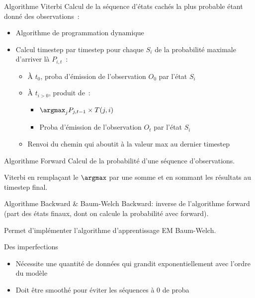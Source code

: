 \begin{frame}{Algorithme Viterbi}
  Calcul de la séquence d'états cachés la plus probable étant donné des observations~:
  \begin{itemize}[<+->]
  \item Algorithme de programmation dynamique
  \item Calcul timestep par timestep pour chaque $S_i$ de la probabilité maximale d'arriver là $P_{i, t}$~:
    \begin{itemize}
      \item À $t_0$, proba d'émission de l'observation $O_0$ par l'état $S_i$
      \item À $t_{i>0}$, produit de~:
        \begin{itemize}
          \item $\argmax_j P_{j, t - 1} \times T(j, i)$
          \item Proba d'émission de l'observation $O_t$ par l'état $S_i$
        \end{itemize}
      \item Renvoi du chemin qui aboutit à la valeur max au dernier timestep
    \end{itemize}
  \end{itemize}
\end{frame}

\begin{frame}{Algorithme Forward}
  Calcul de la probabilité d'une séquence d'observations.

  Viterbi en remplaçant le $\argmax$ par une somme et en sommant les résultats au timestep final.
\end{frame}

\begin{frame}{Algorithme Backward \& Baum-Welch}
  Backward: inverse de l'algorithme forward (part des états finaux, dont on calcule la probabilité avec forward).

  Permet d'implémenter l'algorithme d'apprentissage EM Baum-Welch.
\end{frame}

\begin{frame}{Des imperfections}
  \begin{itemize}[<+->]
  \item Nécessite une quantité de données qui grandit exponentiellement avec l'ordre du modèle
  \item Doit être smoothé pour éviter les séquences à 0 de proba
  \end{itemize}
\end{frame}
